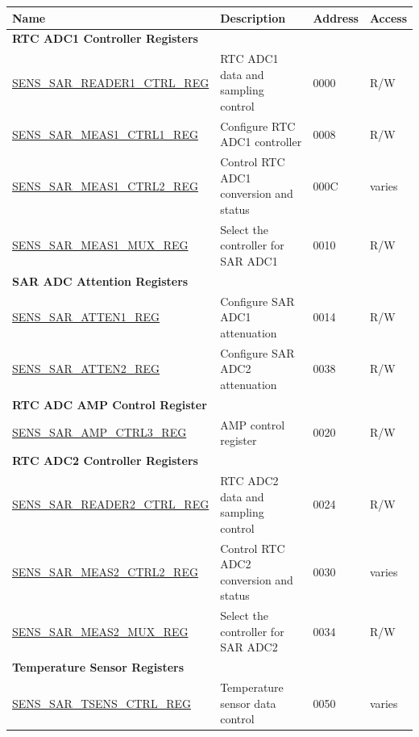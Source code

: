 \begin{longtable}{ | p{6cm} | p{7.2cm} | p{1.3cm} | p{1cm} | }
\hline\rowcolor{lightgray}
Name & Description &  Address & Access \\ \hline
\endhead
\multicolumn{4}{|l|}{\textbf{RTC ADC1 Controller Registers}} \\ \hline
\hyperref[regdesc:SENSSARREADER1CTRLREG]{SENS\_SAR\_READER1\_CTRL\_REG} & RTC ADC1 data and sampling control & \hexprefix{}0000 & R/W \\ \hline
\hyperref[regdesc:SENSSARMEAS1CTRL1REG]{SENS\_SAR\_MEAS1\_CTRL1\_REG} & Configure RTC ADC1 controller & \hexprefix{}0008 & R/W \\ \hline
\hyperref[regdesc:SENSSARMEAS1CTRL2REG]{SENS\_SAR\_MEAS1\_CTRL2\_REG} & Control RTC ADC1 conversion and status & \hexprefix{}000C & varies \\ \hline
\hyperref[regdesc:SENSSARMEAS1MUXREG]{SENS\_SAR\_MEAS1\_MUX\_REG} & Select the controller for SAR ADC1 & \hexprefix{}0010 & R/W \\ \hline
\multicolumn{4}{|l|}{\textbf{SAR ADC Attention Registers}} \\ \hline
\hyperref[regdesc:SENSSARATTEN1REG]{SENS\_SAR\_ATTEN1\_REG} & Configure SAR ADC1 attenuation & \hexprefix{}0014 & R/W \\ \hline
\hyperref[regdesc:SENSSARATTEN2REG]{SENS\_SAR\_ATTEN2\_REG} & Configure SAR ADC2 attenuation & \hexprefix{}0038 & R/W \\ \hline
\multicolumn{4}{|l|}{\textbf{RTC ADC AMP Control Register}} \\ \hline
\hyperref[regdesc:SENSSARAMPCTRL3REG]{SENS\_SAR\_AMP\_CTRL3\_REG} & AMP control register & \hexprefix{}0020 & R/W \\ \hline
\multicolumn{4}{|l|}{\textbf{RTC ADC2 Controller Registers}} \\ \hline
\hyperref[regdesc:SENSSARREADER2CTRLREG]{SENS\_SAR\_READER2\_CTRL\_REG} & RTC ADC2 data and sampling control & \hexprefix{}0024 & R/W \\ \hline
\hyperref[regdesc:SENSSARMEAS2CTRL2REG]{SENS\_SAR\_MEAS2\_CTRL2\_REG} & Control RTC ADC2 conversion and status & \hexprefix{}0030 & varies \\ \hline
\hyperref[regdesc:SENSSARMEAS2MUXREG]{SENS\_SAR\_MEAS2\_MUX\_REG} & Select the controller for SAR ADC2 & \hexprefix{}0034 & R/W \\ \hline
\multicolumn{4}{|l|}{\textbf{Temperature Sensor Registers}} \\ \hline
\hyperref[regdesc:SENSSARTSENSCTRLREG]{SENS\_SAR\_TSENS\_CTRL\_REG} & Temperature sensor data control& \hexprefix{}0050 & varies \\ \hline

\end{longtable}
